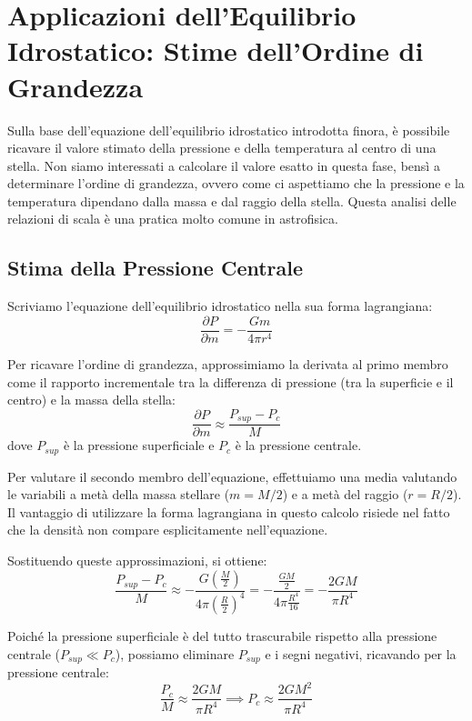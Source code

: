 \section{Applicazioni dell'Equilibrio Idrostatico: Stime dell'Ordine di Grandezza}

Sulla base dell'equazione dell'equilibrio idrostatico introdotta finora, è possibile ricavare il valore stimato della pressione e della temperatura al centro di una stella. Non siamo interessati a calcolare il valore esatto in questa fase, bensì a determinare l'ordine di grandezza, ovvero come ci aspettiamo che la pressione e la temperatura dipendano dalla massa e dal raggio della stella. Questa analisi delle relazioni di scala è una pratica molto comune in astrofisica.

\subsection{Stima della Pressione Centrale}

Scriviamo l'equazione dell'equilibrio idrostatico nella sua forma lagrangiana:
\begin{equation}
\frac{\partial P}{\partial m} = -\frac{G m}{4\pi r^4}
\end{equation}

Per ricavare l'ordine di grandezza, approssimiamo la derivata al primo membro come il rapporto incrementale tra la differenza di pressione (tra la superficie e il centro) e la massa della stella:
\begin{equation}
\frac{\partial P}{\partial m} \approx \frac{P_{sup} - P_c}{M}
\end{equation}
dove $P_{sup}$ è la pressione superficiale e $P_c$ è la pressione centrale.

Per valutare il secondo membro dell'equazione, effettuiamo una media valutando le variabili a metà della massa stellare ($m = M/2$) e a metà del raggio ($r = R/2$). Il vantaggio di utilizzare la forma lagrangiana in questo calcolo risiede nel fatto che la densità non compare esplicitamente nell'equazione.

Sostituendo queste approssimazioni, si ottiene:
\begin{equation}
\frac{P_{sup} - P_c}{M} \approx - \frac{G \left(\frac{M}{2}\right)}{4\pi \left(\frac{R}{2}\right)^4} = - \frac{\frac{G M}{2}}{4\pi \frac{R^4}{16}} = - \frac{2 G M}{\pi R^4}
\end{equation}

Poiché la pressione superficiale è del tutto trascurabile rispetto alla pressione centrale ($P_{sup} \ll P_c$), possiamo eliminare $P_{sup}$ e i segni negativi, ricavando per la pressione centrale:
\begin{equation}
\frac{P_c}{M} \approx \frac{2 G M}{\pi R^4} \implies P_c \approx \frac{2 G M^2}{\pi R^4}
\end{equation}

